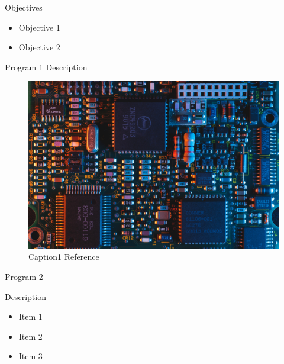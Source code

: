 \documentclass[final]{beamer}
\newlength{\onecolwid}
\newlength{\threecolwid}
\begin{document}
\begin{frame}[t]
\begin{columns}[t,totalwidth=\threecolwid]
\begin{column}{\onecolwid}

\begin{alertblock}{Objectives}
\begin{itemize}
        \item Objective 1
	\item Objective 2
\end{itemize}

\end{alertblock}


\begin{block}{Program 1}
Description

\begin{figure}
	\label{fig:figure_label_ex1}
	\includegraphics[width=0.9\linewidth]{graphic_name1}
	\caption{Caption1 Reference \cite{call_tag_article}}
\end{figure}

\end{block}

\begin{block}{Program 2}

Description
 
\begin{itemize}
	\item{Item 1}
	\item{Item 2}
	\item{Item 3}
\end{itemize}


\end{block}
\end{column}
\end{columns}
\end{frame}
\end{document}
